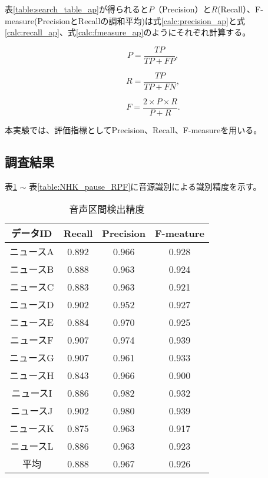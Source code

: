 表\ref{table:search_table_ap}が得られると$P$（Precision）と$R$(Recall）、F-measure(PrecisionとRecallの調和平均)は式\ref{calc:precision_ap}と式\ref{calc:recall_ap}、式\ref{calc:fmeasure_ap}のようにそれぞれ計算する。

\begin{equation}
\label{calc:precision_ap}
P = \frac{TP}{TP + FP},
\end{equation}

\begin{equation}
\label{calc:recall_ap}
R = \frac{TP}{TP + FN},
\end{equation}

\begin{equation}
\label{calc:fmeasure_ap}
F = \frac{2 \times P \times R}{P + R}.
\end{equation}

本実験では、評価指標としてPrecision、Recall、F-measureを用いる。

\subsection{調査結果}
表\ref{table:NHK_speech_RPF} $\sim$ 表\ref{table:NHK_pause_RPF}に音源識別による識別精度を示す。
\begin{table}[H]
  \begin{center}
    \caption{音声区間検出精度 \label{table:NHK_speech_RPF}}
    \begin{tabular}{|c||c|c|c|} \hline
データID & Recall & Precision & F-meature \\ \hline
ニュースA & 0.892 & 0.966 & 0.928 \\ \hline
ニュースB & 0.888 & 0.963 & 0.924 \\ \hline
ニュースC & 0.883 & 0.963 & 0.921 \\ \hline
ニュースD & 0.902 & 0.952 & 0.927 \\ \hline
ニュースE & 0.884 & 0.970 & 0.925 \\ \hline
ニュースF & 0.907 & 0.974 & 0.939 \\ \hline
ニュースG & 0.907 & 0.961 & 0.933 \\ \hline
ニュースH & 0.843 & 0.966 & 0.900 \\ \hline
ニュースI & 0.886 & 0.982 & 0.932 \\ \hline
ニュースJ & 0.902 & 0.980 & 0.939 \\ \hline
ニュースK & 0.875 & 0.963 & 0.917 \\ \hline
ニュースL & 0.886 & 0.963 & 0.923 \\ \hline
 平均 & 0.888 & 0.967 & 0.926 \\ \hline
    \end{tabular}
  \end{center}
\end{table}

